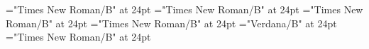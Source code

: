 \documentclass{article}
\begin{document}
 
\thispagestyle{empty} 
\font{}="Times New Roman/B" at 24pt
\font{}="Times New Roman/B" at 24pt
\font{}="Times New Roman/B" at 24pt
\font{}="Times New Roman/B" at 24pt
\font{}="Verdana/B" at 24pt
\font{}="Times New Roman/B" at 24pt
\begin{center}
\end{center}
\begin{center}
\end{center}
\begin{center}
\end{center}
\begin{center}
\end{center}
\begin{center}
\end{center}
\begin{center}
\end{center}
\end{document}
